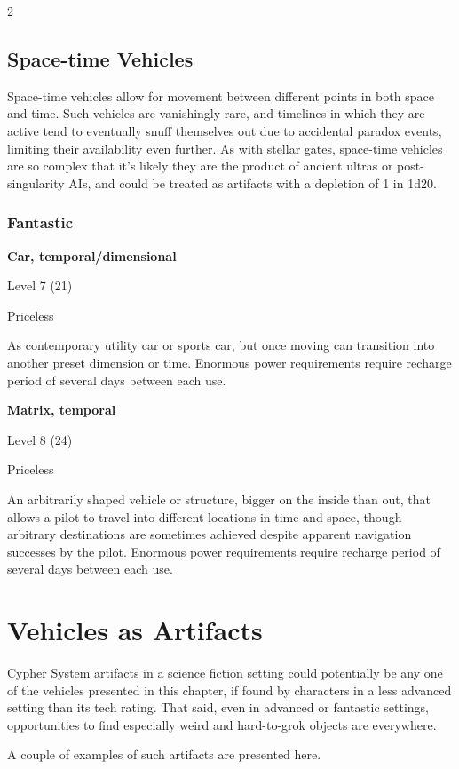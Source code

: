 \begin{multicols}{2}
\subsection{Space-time Vehicles}

Space-time vehicles allow for movement between different points in both space and time. Such vehicles are vanishingly rare, and timelines in which they are active tend to eventually snuff themselves out due to accidental paradox events, limiting their availability even further. As with stellar gates, space-time vehicles are so complex that it’s likely they are the product of ancient ultras or post-singularity AIs, and could be treated as artifacts with a depletion of 1 in 1d20.

\subsubsection{Fantastic}

\textbf{Car, temporal/dimensional} 

Level 7 (21) 

Priceless 

As contemporary utility car or sports car, but once moving can transition into another preset dimension or time. Enormous power requirements require recharge period of several days between each use. 

\textbf{Matrix, temporal} 

Level 8 (24) 

Priceless 

An arbitrarily shaped vehicle or structure, bigger on the inside than out, that allows a pilot to travel into different locations in time and space, though arbitrary destinations are sometimes achieved despite apparent navigation successes by the pilot. Enormous power requirements require recharge period of several days between each use.

\section{Vehicles as Artifacts}

Cypher System artifacts in a science fiction setting could potentially be any one of the vehicles presented in this chapter, if found by characters in a less advanced setting than its tech rating. That said, even in advanced or fantastic settings, opportunities to find especially weird and hard-to-grok objects are everywhere. 

A couple of examples of such artifacts are presented here. 


\end{multicols}

